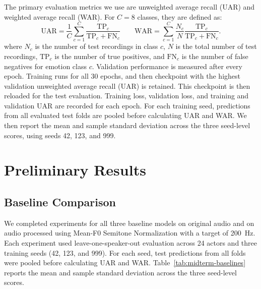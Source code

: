 \documentclass[11pt, letterpaper]{article}
\begin{document}
The primary evaluation metrics we use are unweighted average recall (UAR) and weighted average recall (WAR). For $C=8$ classes, they are defined as:
\[
    \mathrm{UAR}
    =
    \frac{1}{C}\sum_{c=1}^{C}
    \frac{\mathrm{TP}_c}{\mathrm{TP}_c+\mathrm{FN}_c}
    \qquad
    \mathrm{WAR}
    =
    \sum_{c=1}^{C}\frac{N_c}{N}
    \frac{\mathrm{TP}_c}{\mathrm{TP}_c+\mathrm{FN}_c}.
\]
where $N_c$ is the number of test recordings in class $c$, $N$ is the total number of test recordings, $\mathrm{TP}_c$ is the number of true positives, and $\mathrm{FN}_c$ is the number of false negatives for emotion class $c$. Validation performance is measured after every epoch. Training runs for all 30 epochs, and then checkpoint with the highest validation unweighted average recall (UAR) is retained. This checkpoint is then reloaded for the test evaluation. Training loss, validation loss, and training and validation UAR are recorded for each epoch. For each training seed, predictions from all evaluated test folds are pooled before calculating UAR and WAR. We then report the
mean and sample standard deviation across the three seed-level scores, using seeds 42, 123, and 999.

\section{Preliminary Results}

\subsection{Baseline Comparison}

We completed experiments for all three baseline models on original audio and on audio processed using Mean-F0 Semitone Normalization with a target of 200~Hz. Each experiment used leave-one-speaker-out evaluation across 24 actors and three training seeds (42, 123, and 999). For each seed, test predictions from all folds were pooled before calculating UAR and WAR. Table~\ref{tab:midterm-baselines} reports the mean and sample standard deviation across the three seed-level scores.
\end{document}
